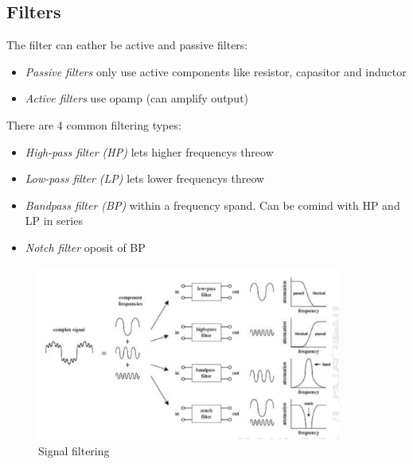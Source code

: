 



\subsection{Filters}
The filter can eather be active and passive filters:
\begin{itemize}
    \item \textit{Passive filters} only use active components like resistor, capasitor and inductor
    \item \textit{Active filters} use opamp (can amplify output)
\end{itemize}

There are 4 common filtering types:
\begin{itemize}
    \item \textit{High-pass filter (HP)} lets higher frequencys threow
    \item \textit{Low-pass filter (LP)} lets lower frequencys threow
    \item \textit{Bandpass filter (BP)} within a frequency spand. Can be comind with HP and LP in series
    \item \textit{Notch filter} oposit of BP
\end{itemize}
\begin{figure}[h]
    \vspace{10mm}
    \centering
    \includegraphics[width=10cm]{image/signal-filtering.png}
    \caption{Signal filtering}
\end{figure}


